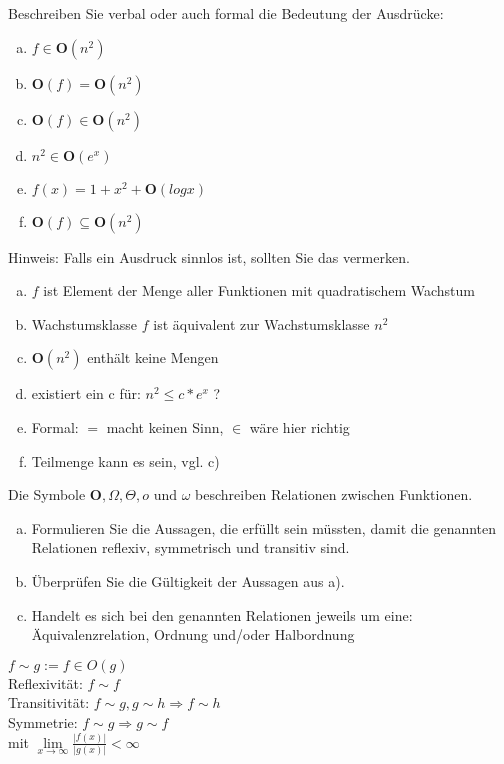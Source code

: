 \begin{card}
	Beschreiben Sie verbal oder auch formal die Bedeutung der Ausdrücke: 
	\begin{enumerate}[a)]
	\item $f \in \mathbf{O}(n^2)$
	\item $\mathbf{O}(f) = \mathbf{O}(n^2)$
	\item $\mathbf{O}(f) \in \mathbf{O}(n^2)$
	\item $n^2 \in \mathbf{O}(e^x)$
	\item $f(x) = 1+x^2+\mathbf{O}(log x)$
	\item $\mathbf{O}(f) \subseteq \mathbf{O}(n^2)$
	\end{enumerate}
	Hinweis: Falls ein Ausdruck sinnlos ist, sollten Sie das vermerken.
	\hr
	\begin{enumerate}[a)]
	\item $f$ ist Element der Menge aller Funktionen mit quadratischem Wachstum
	\item Wachstumsklasse $f$ ist äquivalent zur Wachstumsklasse $n^2$
	\item \lightning  $\mathbf{O}(n^2)$ enthält keine Mengen
	\item existiert ein c für: $n^2 \leq c * e^x$ ?
	\item Formal: $=$ macht keinen Sinn, $\in$ wäre hier richtig
	\item Teilmenge kann es sein, vgl. c)
	\end{enumerate}
\end{card}

\begin{card}
	Die Symbole $\mathbf{O}, \Omega, \Theta,o \text{ und } \omega$ beschreiben Relationen zwischen Funktionen.
	\begin{enumerate}[a)]
	\item Formulieren Sie die Aussagen, die erfüllt sein müssten, damit die genannten Relationen reflexiv, symmetrisch und transitiv sind.\\
	\item Überprüfen Sie die Gültigkeit der Aussagen aus a). 
	\item Handelt es sich bei den genannten Relationen jeweils um eine:
	Äquivalenzrelation, Ordnung und/oder Halbordnung 
	\end{enumerate}
	\hr
	$f \sim g := f \in O(g)$\\
	Reflexivität: $f \sim f$\\
	Transitivität: $f \sim g, g \sim h \Rightarrow f \sim h$\\
	Symmetrie: $f \sim g \Rightarrow g \sim f$\\
	mit $\lim\limits_{x \to \infty} \frac{|f(x)|}{|g(x)|} < \infty$
\end{card}